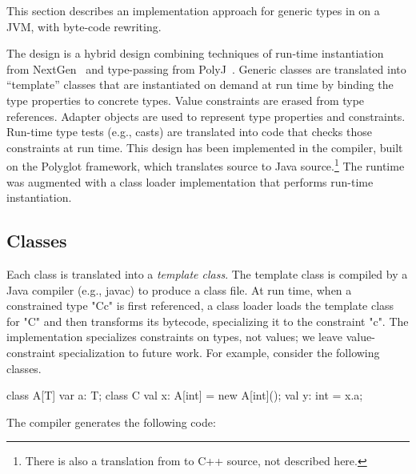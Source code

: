 This section describes an implementation approach for generic types in
\Xten{} on a JVM, with byte-code rewriting.

The design is a hybrid design combining techniques of run-time
instantiation from
NextGen~\cite{nextgen,allen03,allen04} and type-passing from
PolyJ~\cite{java-popl97}.  Generic classes are translated
into ``template'' classes that are instantiated on demand at run time by
binding the type properties to concrete types.
%
Value constraints are erased from type references.
Adapter objects are used to represent type
properties and constraints.  
Run-time type tests (e.g., casts) are translated
into code that checks those constraints at run time.
%
This design has been implemented in the \Xten{} compiler, built
on the Polyglot framework, which
translates \Xten{} source to Java source.\footnote{There is also
a translation from \Xten{} to C++ source, not described here.}
The \Xten{} runtime was augmented with a class loader
implementation that performs run-time instantiation.

\subsection{Classes}
Each class is translated into a \emph{template class}.
The template class is compiled by a Java compiler (e.g., javac)
to produce a class file.
At run time, when a constrained type \xcd"C{c}" is first referenced, a
class loader loads the template class for \xcd"C" and then
transforms its bytecode, specializing it to the constraint
\xcd"c".  The implementation specializes constraints on
types, not values; we leave value-constraint specialization to
future work.
%
For example, consider the following classes.
{\footnotesize
\begin{xten}
class A[T] {
    var a: T;
}
class C {
    val x: A[int] = new A[int]();
    val y: int = x.a;
}
\end{xten}}

The compiler generates the following code:
{\footnotesize
{}}

